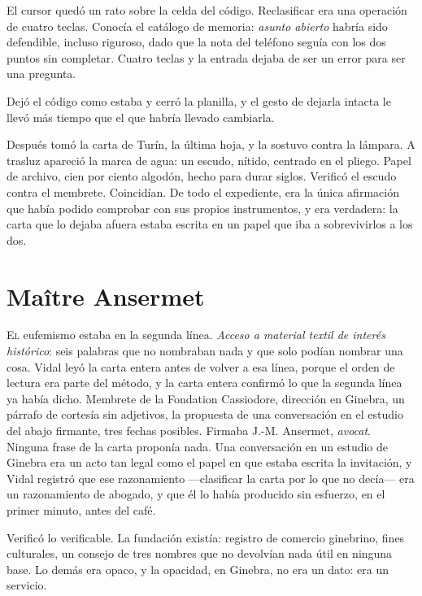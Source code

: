 El cursor quedó un rato sobre la celda del código. Reclasificar era una operación de cuatro teclas. Conocía el catálogo de memoria: \textit{asunto abierto} habría sido defendible, incluso riguroso, dado que la nota del teléfono seguía con los dos puntos sin completar. Cuatro teclas y la entrada dejaba de ser un error para ser una pregunta.

Dejó el código como estaba y cerró la planilla, y el gesto de dejarla intacta le llevó más tiempo que el que habría llevado cambiarla.

Después tomó la carta de Turín, la última hoja, y la sostuvo contra la lámpara. A trasluz apareció la marca de agua: un escudo, nítido, centrado en el pliego. Papel de archivo, cien por ciento algodón, hecho para durar siglos. Verificó el escudo contra el membrete. Coincidían. De todo el expediente, era la única afirmación que había podido comprobar con sus propios instrumentos, y era verdadera: la carta que lo dejaba afuera estaba escrita en un papel que iba a sobrevivirlos a los dos.

\clearpage

\chapter{Maître Ansermet}

\lettrine[lines=2, lhang=0.1, nindent=0.2em]{E}{l} eufemismo estaba en la segunda línea. \textit{Acceso a material textil de interés histórico}: seis palabras que no nombraban nada y que solo podían nombrar una cosa. Vidal leyó la carta entera antes de volver a esa línea, porque el orden de lectura era parte del método, y la carta entera confirmó lo que la segunda línea ya había dicho. Membrete de la Fondation Cassiodore, dirección en Ginebra, un párrafo de cortesía sin adjetivos, la propuesta de una conversación en el estudio del abajo firmante, tres fechas posibles. Firmaba J.-M. Ansermet, \textit{avocat}. Ninguna frase de la carta proponía nada. Una conversación en un estudio de Ginebra era un acto tan legal como el papel en que estaba escrita la invitación, y Vidal registró que ese razonamiento ---clasificar la carta por lo que no decía--- era un razonamiento de abogado, y que él lo había producido sin esfuerzo, en el primer minuto, antes del café.


Verificó lo verificable. La fundación existía: registro de comercio ginebrino, fines culturales, un consejo de tres nombres que no devolvían nada útil en ninguna base. Lo demás era opaco, y la opacidad, en Ginebra, no era un dato: era un servicio.

